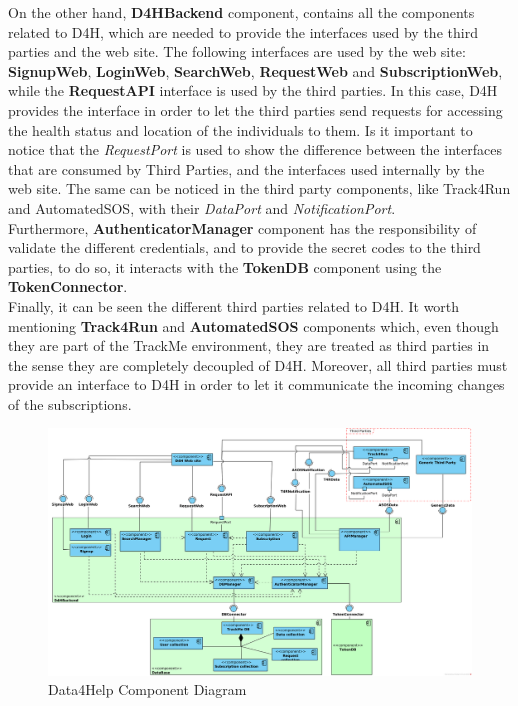 \documentclass[a4paper, hidelinks, 12pt]{report}
\begin{document}
		On the other hand, \textbf{D4HBackend} component, contains all the components related to D4H, which are needed to provide the interfaces used by the third parties and the web site. The following interfaces are used by the web site: \textbf{SignupWeb}, \textbf{LoginWeb}, \textbf{SearchWeb}, \textbf{RequestWeb} and  \textbf{SubscriptionWeb}, while the \textbf{RequestAPI} interface is used by the third parties. In this case, D4H provides the interface in order to let the third parties send requests for accessing the health status and location of the individuals to them. Is it important to notice that the \textit{RequestPort} is used to show the difference between the interfaces that are consumed by Third Parties, and the interfaces used internally by the web site. The same can be noticed in the third party components, like Track4Run and AutomatedSOS, with their \textit{DataPort} and \textit{NotificationPort}.\\
		
		Furthermore, \textbf{AuthenticatorManager} component has the responsibility of validate the different credentials, and to provide the secret codes to the third parties, to do so, it interacts with the \textbf{TokenDB} component using the \textbf{TokenConnector}.\\
		
		Finally, it can be seen the different third parties related to D4H. It worth mentioning \textbf{Track4Run} and \textbf{AutomatedSOS} components which, even though they are part of the TrackMe environment, they are treated as third parties in the sense they are completely decoupled of D4H. Moreover, all third parties must provide an interface to D4H in order to let it communicate the incoming changes of the subscriptions.\\
	
			\begin{figure}
    				\centering
				\includegraphics[width=1\textwidth]{diagrams/d4h_component_diagram.png}
				\caption[Data4Help Component Diagram]{Data4Help Component Diagram}
				\label{fig:d4h_component_diagram}
			\end{figure}	
			\clearpage
\end{document}

